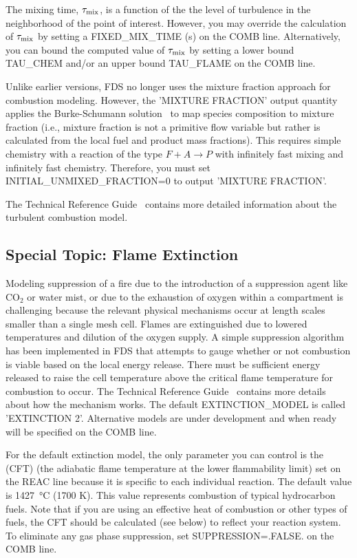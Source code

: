 \documentclass[11pt]{book}
\begin{document}
The mixing time, $\tau_{\rm mix}$, is a function of the the level of turbulence in the neighborhood of the point of interest. However, you may override the calculation of $\tau_{\rm mix}$ by setting a {\ct FIXED\_MIX\_TIME} (s) on the {\ct COMB} line. Alternatively, you can bound the computed value of $\tau_{\rm mix}$ by setting a lower bound {\ct TAU\_CHEM} and/or an upper bound {\ct TAU\_FLAME} on the {\ct COMB} line.

Unlike earlier versions, FDS no longer uses the mixture fraction approach for combustion modeling. However, the {\ct 'MIXTURE FRACTION'} output quantity applies the Burke-Schumann solution~\cite{Turns:1996} to map species composition to mixture fraction (i.e., mixture fraction is not a primitive flow variable but rather is calculated from the local fuel and product mass fractions).  This requires simple chemistry with a reaction of the type $\si{F} + \si{A} \rightarrow \si {P}$ with infinitely fast mixing and infinitely fast chemistry.  Therefore, you must set {\ct INITIAL\_UNMIXED\_FRACTION=0} to output {\ct 'MIXTURE FRACTION'}.

The Technical Reference Guide~\cite{FDS_Math_Guide} contains more detailed information about the turbulent combustion model.

\subsection{Special Topic: Flame Extinction}
\label{info:extinction}

Modeling suppression of a fire due to the introduction of a suppression agent like CO$_2$ or water mist, or due to the exhaustion of oxygen within a compartment is challenging because the relevant physical mechanisms occur at length scales smaller than a single mesh cell. Flames are extinguished due to lowered temperatures and dilution of the oxygen supply. A simple suppression algorithm has been implemented in FDS that attempts to gauge whether or not combustion is viable based on the local energy release. There must be sufficient energy released to raise the cell temperature above the critical flame temperature for combustion to occur. The Technical Reference Guide~\cite{FDS_Math_Guide} contains more details about how the mechanism works. The default {\ct EXTINCTION\_MODEL} is called {\ct 'EXTINCTION 2'}. Alternative models are under development and when ready will be specified on the {\ct COMB} line.

For the default extinction model, the only parameter you can control is the  (CFT) (the adiabatic flame temperature at the lower flammability limit) set on the {\ct REAC} line because it is specific to each individual reaction. The default value is 1427~\si{\degreeCelsius} (1700 K). This value represents combustion of typical hydrocarbon fuels. Note that if you are using an effective heat of combustion or other types of fuels, the CFT should be calculated (see below) to reflect your reaction system. To eliminate any gas phase suppression, set {\ct SUPPRESSION=.FALSE.} on the {\ct COMB} line.
\end{document}
